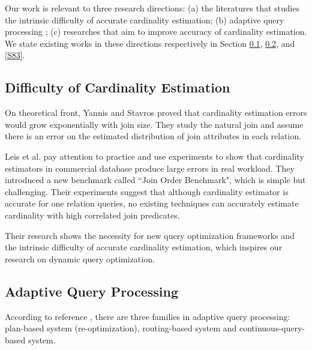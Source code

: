 Our work is relevant to three research directions: (a) the literatures that studies the intrinsic difficulty of accurate cardinality estimation; (b) adaptive query processing \cite{paper57}; (c) researches that aim to improve accuracy of cardinality estimation. We state existing works in these directions respectively in Section \ref{S81}, \ref{S82}, and \ref{S83}.
\subsection{Difficulty of Cardinality Estimation} \label{S81}
    On theoretical front, Yannis and Stavros \cite{paper31} proved that cardinality estimation errors would grow exponentially with join size. They study the natural join and assume there is an error on the estimated distribution of join attributes in each relation.\par
    Leis et al. \cite{JOB} pay attention to practice and use experiments to show that cardinality estimators in commercial database produce large errors in real workload. They introduced a new benchmark called ``Join Order Benchmark", which is simple but challenging. Their experiments suggest that although cardinality estimator is accurate for one relation queries, no existing techniques can accurately estimate cardinality with high correlated join predicates.\par
    Their research shows the necessity for new query optimization frameworks and the intrinsic difficulty of accurate cardinality estimation, which inspires our research on dynamic query optimization.

\subsection{Adaptive Query Processing} \label{S82}
    According to reference \cite{paper47}, there are three families in adaptive query processing: plan-based system (re-optimization), routing-based system and continuous-query-based system.  
    
